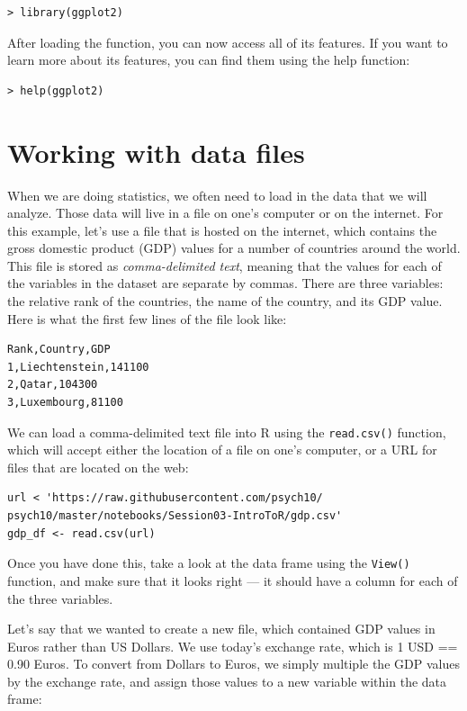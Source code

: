 \documentclass[12pt,]{book}
\begin{document}
\begin{verbatim}
> library(ggplot2)
\end{verbatim}

After loading the function, you can now access all of its features. If you want to learn more about its features, you can find them using the help function:

\begin{verbatim}
> help(ggplot2)
\end{verbatim}

\hypertarget{working-with-data-files}{%
\section{Working with data files}\label{working-with-data-files}}

When we are doing statistics, we often need to load in the data that we will analyze. Those data will live in a file on one's computer or on the internet. For this example, let's use a file that is hosted on the internet, which contains the gross domestic product (GDP) values for a number of countries around the world. This file is stored as \emph{comma-delimited text}, meaning that the values for each of the variables in the dataset are separate by commas. There are three variables: the relative rank of the countries, the name of the country, and its GDP value. Here is what the first few lines of the file look like:

\begin{verbatim}
Rank,Country,GDP
1,Liechtenstein,141100
2,Qatar,104300
3,Luxembourg,81100
\end{verbatim}

We can load a comma-delimited text file into R using the \texttt{read.csv()} function, which will accept either the location of a file on one's computer, or a URL for files that are located on the web:

\begin{verbatim}
url < 'https://raw.githubusercontent.com/psych10/
psych10/master/notebooks/Session03-IntroToR/gdp.csv'
gdp_df <- read.csv(url)
\end{verbatim}

Once you have done this, take a look at the data frame using the \texttt{View()} function, and make sure that it looks right --- it should have a column for each of the three variables.

Let's say that we wanted to create a new file, which contained GDP values in Euros rather than US Dollars. We use today's exchange rate, which is 1 USD == 0.90 Euros. To convert from Dollars to Euros, we simply multiple the GDP values by the exchange rate, and assign those values to a new variable within the data frame:
\end{document}
